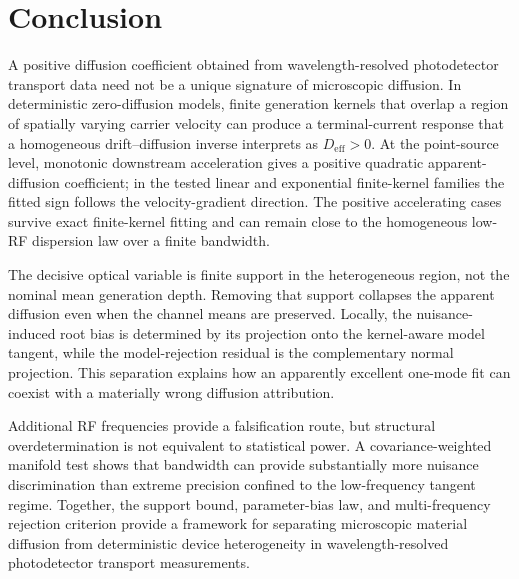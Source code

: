 \documentclass[aps,pra,twocolumn,superscriptaddress,nofootinbib]{revtex4-2}
\newcommand{\Deff}{D_{\mathrm{eff}}}
\begin{document}
\section{Conclusion}

A positive diffusion coefficient obtained from wavelength-resolved photodetector transport data need not be a unique signature of microscopic diffusion. In deterministic zero-diffusion models, finite generation kernels that overlap a region of spatially varying carrier velocity can produce a terminal-current response that a homogeneous drift--diffusion inverse interprets as $\Deff>0$.  At the point-source level, monotonic downstream acceleration gives a positive quadratic apparent-diffusion coefficient; in the tested linear and exponential finite-kernel families the fitted sign follows the velocity-gradient direction.  The positive accelerating cases survive exact finite-kernel fitting and can remain close to the homogeneous low-RF dispersion law over a finite bandwidth.

The decisive optical variable is finite support in the heterogeneous region, not the nominal mean generation depth. Removing that support collapses the apparent diffusion even when the channel means are preserved. Locally, the nuisance-induced root bias is determined by its projection onto the kernel-aware model tangent, while the model-rejection residual is the complementary normal projection. This separation explains how an apparently excellent one-mode fit can coexist with a materially wrong diffusion attribution.

Additional RF frequencies provide a falsification route, but structural overdetermination is not equivalent to statistical power. A covariance-weighted manifold test shows that bandwidth can provide substantially more nuisance discrimination than extreme precision confined to the low-frequency tangent regime. Together, the support bound, parameter-bias law, and multi-frequency rejection criterion provide a framework for separating microscopic material diffusion from deterministic device heterogeneity in wavelength-resolved photodetector transport measurements.



\end{document}
